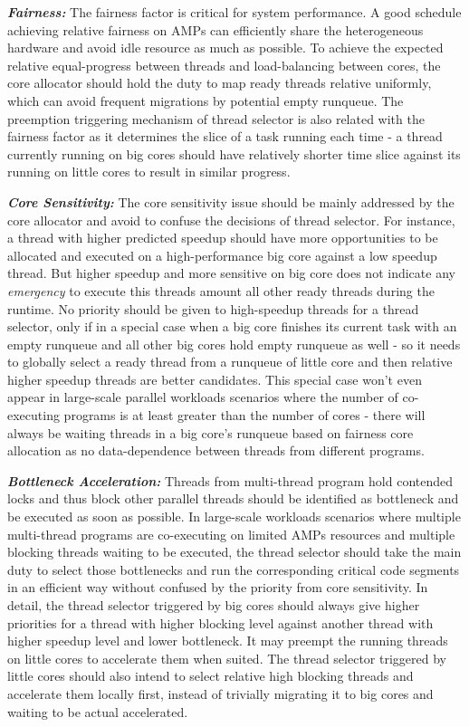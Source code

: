\documentclass[sigplan,review,anonymous]{acmart}\settopmatter{printfolios=true,printccs=false,printacmref=false}
\begin{document}
\textbf{\textit{Fairness:}} The fairness factor is critical for system performance. A good schedule achieving relative fairness on AMPs can efficiently share the heterogeneous hardware and avoid idle resource as much as possible. To achieve the expected relative equal-progress between threads and load-balancing between cores, the core allocator should hold the duty to map ready threads relative uniformly, which can avoid frequent migrations by potential empty runqueue. The preemption triggering mechanism of thread selector is also related with the fairness factor as it determines the slice of a task running each time - a thread currently running on big cores should have relatively shorter time slice against its running on little cores to result in similar progress.

\textbf{\textit{Core Sensitivity:}} The core sensitivity issue should be mainly addressed by the core allocator and avoid to confuse the decisions of thread selector. For instance, a thread with higher predicted speedup should have more opportunities to be allocated and executed on a high-performance big core against a low speedup thread. But higher speedup and more sensitive on big core does not indicate any {\it emergency} to execute this threads amount all other ready threads during the runtime. No priority should be given to high-speedup threads for a thread selector, only if in a special case when a big core finishes its current task with an empty runqueue and all other big cores hold empty runqueue as well - so it needs to globally select a ready thread from a runqueue of little core and then relative higher speedup threads are better candidates. This special case won't even appear in large-scale parallel workloads scenarios where the number of co-executing programs is at least greater than the number of cores - there will always be waiting threads in a big core's runqueue based on fairness core allocation as no data-dependence between threads from different programs. 

\textbf{\textit{Bottleneck Acceleration:}} Threads from multi-thread program hold contended locks and thus block other parallel threads should be identified as bottleneck and be executed as soon as possible. In large-scale workloads scenarios where multiple multi-thread programs are co-executing on limited AMPs resources and multiple blocking threads waiting to be executed, the thread selector should take the main duty to select those bottlenecks and run the corresponding critical code segments in an efficient way without confused by the priority from core sensitivity. In detail, the thread selector triggered by big cores should always give higher priorities for a thread with higher blocking level against another thread with higher speedup level and lower bottleneck. It may preempt the running threads on little cores to accelerate them when suited. The thread selector triggered by little cores should also intend to select relative high blocking threads and accelerate them locally first, instead of trivially migrating it to big cores and waiting to be actual accelerated. 
\end{document}
